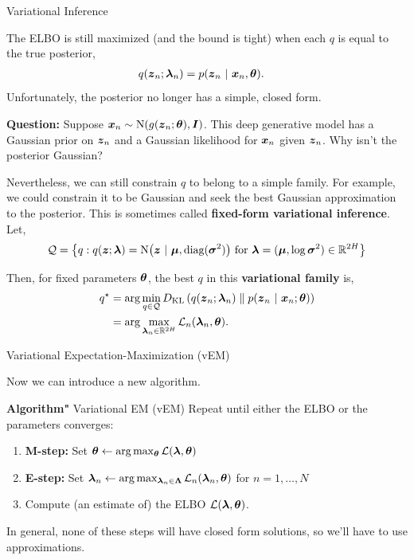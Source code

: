 \documentclass[aspectratio=169]{beamer}
\begin{document}
\begin{frame}[t,allowframebreaks]{Variational Inference}\label{variational-inference}

The ELBO is still maximized (and the bound is tight) when each \(q\) is
equal to the true posterior, \begin{align*}
    q(\boldsymbol{z}_n; \boldsymbol{\lambda}_n) &= p(\boldsymbol{z}_n ~\vert~ \boldsymbol{x}_n, \boldsymbol{\theta}).
\end{align*} Unfortunately, the posterior no longer has a simple, closed
form.

\textbf{Question:} Suppose
\(\boldsymbol{x}_n \sim \mathrm{N}(g(\boldsymbol{z}_n; \boldsymbol{\theta}), \boldsymbol{I})\). This deep
generative model has a Gaussian prior on \(\boldsymbol{z}_n\) and a Gaussian
likelihood for \(\boldsymbol{x}_n\) given \(\boldsymbol{z}_n\). Why isn't the posterior
Gaussian? 

Nevertheless, we can still constrain \(q\) to belong to a simple family.
For example, we could constrain it to be Gaussian and seek the best
Gaussian approximation to the posterior. This is sometimes called
\textbf{fixed-form variational inference}. Let, \begin{align*}
    \mathcal{Q} = \left\{q: q(\boldsymbol{z}; \boldsymbol{\lambda}) = \mathrm{N}\big(\boldsymbol{z} ~\vert~ \boldsymbol{\mu}, \textrm{diag}(\boldsymbol{\sigma}^2)\big) \text{ for } \boldsymbol{\lambda} = (\boldsymbol{\mu}, \log \boldsymbol{\sigma}^2) \in \mathbb{R}^{2H} \right\}
\end{align*}

Then, for fixed parameters \(\boldsymbol{\theta}\), the best \(q\) in this
\textbf{variational family} is, \begin{align*}
    q^\star 
    &= \arg \min_{q \in \mathcal{Q}} D_{\textrm{KL}}\left(q(\boldsymbol{z}_n; \boldsymbol{\lambda}_n)\;\|\;p(\boldsymbol{z}_n ~\vert~ \boldsymbol{x}_n; \boldsymbol{\theta})\right) \\
    &= \arg \max_{\boldsymbol{\lambda}_n \in \mathbb{R}^{2H}} \mathcal{L}_n(\boldsymbol{\lambda}_n, \boldsymbol{\theta}).
\end{align*}
\end{frame}

\begin{frame}[t,allowframebreaks]{Variational Expectation-Maximization
(vEM)}\label{variational-expectation-maximization-vem}

Now we can introduce a new algorithm.

\textbf{Algorithm"} Variational EM (vEM) Repeat until either the ELBO
or the parameters converges: 
\begin{enumerate}
    \item \textbf{M-step:} Set 
    \(\boldsymbol{\theta} \leftarrow \arg \max_{\boldsymbol{\theta}} \mathcal{L}(\boldsymbol{\lambda}, \boldsymbol{\theta})\) 
    \item \textbf{E-step:} Set 
    \(\boldsymbol{\lambda}_n \leftarrow \arg \max_{\boldsymbol{\lambda}_n \in \boldsymbol{\Lambda}} \mathcal{L}_n(\boldsymbol{\lambda}_n, \boldsymbol{\theta})\)
    for \(n=1,\ldots,N\) 
    \item Compute (an estimate of) the ELBO \(\mathcal{L}(\boldsymbol{\lambda}, \boldsymbol{\theta})\).
\end{enumerate}

In general, none of these steps will have closed form solutions, so
we'll have to use approximations.
\end{frame}
\end{document}

